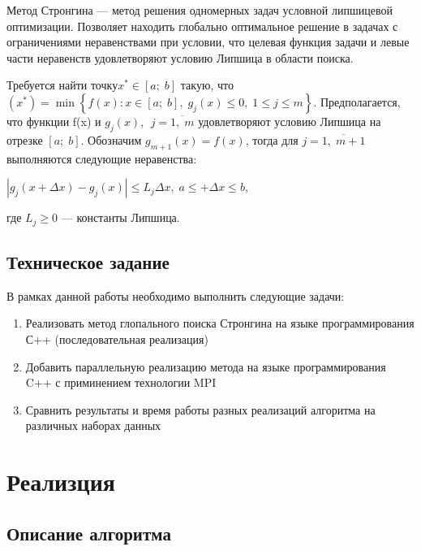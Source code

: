 \documentclass{article}
\begin{document}
\par Метод Стронгина — метод решения одномерных задач условной липшицевой оптимизации. Позволяет находить глобально оптимальное решение в задачах с ограничениями неравенствами при условии, что целевая функция задачи и левые части неравенств удовлетворяют условию Липшица в области поиска. 
\par Требуется найти точку\(x^*\in[a;\;b]\) такую, что \((x^*)=\min\left\{f(x)\colon x\in[a;\;b],\;g_j(x)\leq 0,\;1\leq j\leq m\right\}\). Предполагается, что функции f(x) и \(g_{j}(x)\), \(\;j=\overline{1,\;m}\) удовлетворяют условию Липшица на отрезке \([a;\;b]\).
Обозначим \(g_{m+1}(x)=f(x)\), тогда для \(j=\overline{1,\;m+1}\) выполняются следующие неравенства:

\(|g_j(x+\Delta x)-g_j(x)| \leq L_j\Delta x,\;a\leq+\Delta x \leq b\),

где \(L_j\geq 0\) — константы Липшица.

\subsection*{Техническое задание}
\par В рамках данной работы необходимо выполнить следующие задачи:
\begin{enumerate}
    \item Реализовать метод глопального поиска Стронгина на языке программирования С++ (последовательная реализация)
    \item Добавить параллельную реализацию метода на языке программирования C++ с приминением технологии MPI
    \item Сравнить результаты и время работы разных реализаций алгоритма на различных наборах данных
\end{enumerate}
\newpage

\section*{Реализция}
\subsection*{Описание алгоритма}
\end{document}
